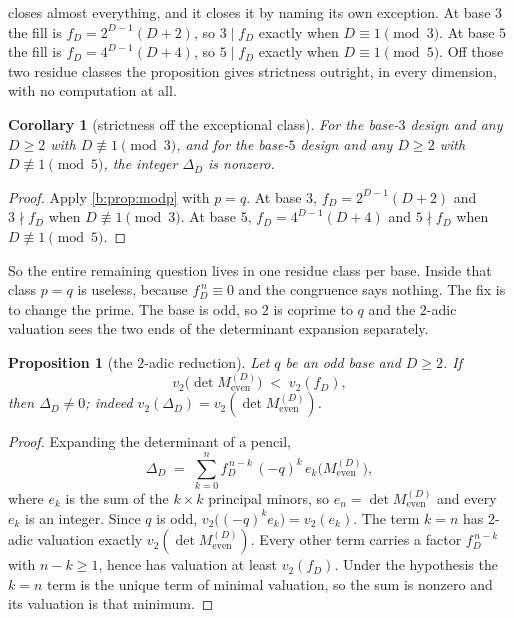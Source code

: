 \documentclass[11pt]{amsart}
\newtheorem{proposition}[theorem]{Proposition}
\newtheorem{corollary}[theorem]{Corollary}
\theoremstyle{definition}
\theoremstyle{remark}
\begin{document}
 closes almost everything, and it closes it by naming its own exception. At base $3$ the fill is $f_D = 2^{D-1}(D+2)$, so $3 \mid f_D$ exactly when $D \equiv 1 \pmod 3$. At base $5$ the fill is $f_D = 4^{D-1}(D+4)$, so $5 \mid f_D$ exactly when $D \equiv 1 \pmod 5$. Off those two residue classes the proposition gives strictness outright, in every dimension, with no computation at all.

\begin{corollary}[strictness off the exceptional class]
\label{b:cor:offclass}
For the base-$3$ design and any $D \ge 2$ with $D \not\equiv 1 \pmod 3$, and for the base-$5$ design and any $D \ge 2$ with $D \not\equiv 1 \pmod 5$, the integer $\Delta_D$ is nonzero.
\end{corollary}

\begin{proof}
Apply \cref{b:prop:modp} with $p = q$. At base $3$, $f_D = 2^{D-1}(D+2)$ and $3 \nmid f_D$ when $D \not\equiv 1 \pmod 3$. At base $5$, $f_D = 4^{D-1}(D+4)$ and $5 \nmid f_D$ when $D \not\equiv 1 \pmod 5$.
\end{proof}

So the entire remaining question lives in one residue class per base. Inside that class $p = q$ is useless, because $f_D^{\,n} \equiv 0$ and the congruence says nothing. The fix is to change the prime. The base is odd, so $2$ is coprime to $q$ and the $2$-adic valuation sees the two ends of the determinant expansion separately.

\begin{proposition}[the $2$-adic reduction]
\label{b:prop:2adic}
Let $q$ be an odd base and $D \ge 2$. If
\[
  v_2\bigl(\det M_{\mathrm{even}}^{(D)}\bigr) \;<\; v_2(f_D),
\]
then $\Delta_D \ne 0$; indeed $v_2(\Delta_D) = v_2(\det M_{\mathrm{even}}^{(D)})$.
\end{proposition}

\begin{proof}
Expanding the determinant of a pencil,
\[
  \Delta_D \;=\; \sum_{k=0}^{n} f_D^{\,n-k}\,(-q)^k\, e_k\bigl(M_{\mathrm{even}}^{(D)}\bigr),
\]
where $e_k$ is the sum of the $k \times k$ principal minors, so $e_n = \det M_{\mathrm{even}}^{(D)}$ and every $e_k$ is an integer. Since $q$ is odd, $v_2\bigl((-q)^k e_k\bigr) = v_2(e_k)$. The term $k = n$ has $2$-adic valuation exactly $v_2(\det M_{\mathrm{even}}^{(D)})$. Every other term carries a factor $f_D^{\,n-k}$ with $n - k \ge 1$, hence has valuation at least $v_2(f_D)$. Under the hypothesis the $k = n$ term is the unique term of minimal valuation, so the sum is nonzero and its valuation is that minimum.
\end{proof}
\end{document}

